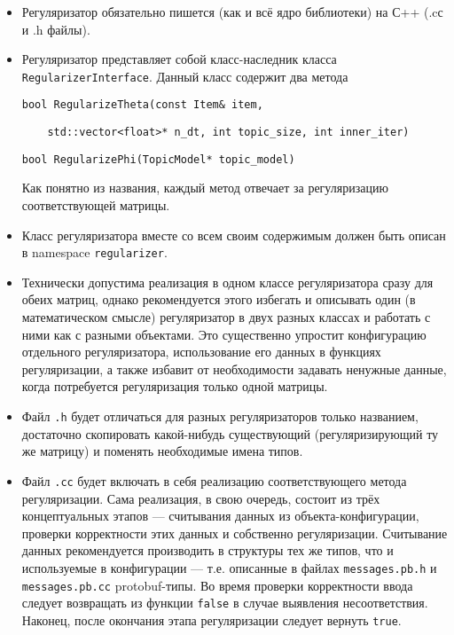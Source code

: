 \begin{itemize}
	\item Регуляризатор обязательно пишется (как и всё ядро библиотеки) на С++ (.cс и .h файлы).

	\item Регуляризатор представляет собой класс-наследник класса \verb'RegularizerInterface'. Данный класс содержит два метода
	
	\vspace{10pt}
	\verb|bool RegularizeTheta(const Item& item,| 
	
	\verb|    std::vector<float>* n_dt, int topic_size, int inner_iter)|
	
	\verb'bool RegularizePhi(TopicModel* topic_model)'
	\vspace{10pt}
	
	Как понятно из названия, каждый метод отвечает за регуляризацию соответствующей матрицы.
	
	\item Класс регуляризатора вместе со всем своим содержимым должен быть описан в namespace \verb'regularizer'.
	
	\item Технически допустима реализация в одном классе регуляризатора сразу для обеих матриц, однако рекомендуется этого избегать и описывать один (в математическом смысле) регуляризатор в двух разных классах и работать с ними как с разными объектами. Это существенно упростит конфигурацию отдельного регуляризатора, использование его данных в функциях регуляризации, а также избавит от необходимости задавать ненужные данные, когда потребуется регуляризация только одной матрицы.
	
	\item Файл \verb'.h' будет отличаться для разных регуляризаторов только названием, достаточно скопировать какой-нибудь существующий (регуляризирующий ту же матрицу) и поменять необходимые имена типов.
	
	\item Файл \verb'.cc' будет включать в себя реализацию соответствующего метода регуляризации. Сама реализация, в свою очередь, состоит из трёх концептуальных этапов --- считывания данных из объекта-конфигурации, проверки корректности этих данных и собственно регуляризации. Считывание данных рекомендуется производить в структуры тех же типов, что и используемые в конфигурации --- т.е. описанные в файлах \verb'messages.pb.h' и \verb'messages.pb.cc' protobuf-типы. Во время проверки корректности ввода следует возвращать из функции \verb'false' в случае выявления несоответствия. Наконец, после окончания этапа регуляризации следует вернуть \verb'true'.
	
\end{itemize}

